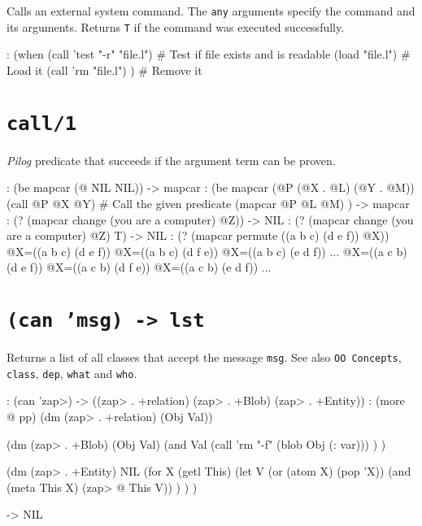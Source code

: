 Calls an external system command. The \texttt{any} arguments specify the
command and its arguments. Returns \texttt{T} if the command was executed
successfully.


\begin{wideverbatim}
: (when (call 'test "-r" "file.l")  # Test if file exists and is readable
   (load "file.l")  # Load it
   (call 'rm "file.l") )  # Remove it
\end{wideverbatim}

 
\section*{\texttt{call/1}}
\label{sec:funct-rec-C-call/1}


\emph{Pilog} predicate that succeeds if the argument term
can be proven.


\begin{wideverbatim}
: (be mapcar (@ NIL NIL))
-> mapcar
: (be mapcar (@P (@X . @L) (@Y . @M))
   (call @P @X @Y)                        # Call the given predicate
   (mapcar @P @L @M) )
-> mapcar
:  (? (mapcar change (you are a computer) @Z))
-> NIL
:  (? (mapcar change (you are a computer) @Z) T)
-> NIL
:  (? (mapcar permute ((a b c) (d e f)) @X))
 @X=((a b c) (d e f))
 @X=((a b c) (d f e))
 @X=((a b c) (e d f))
 ...
 @X=((a c b) (d e f))
 @X=((a c b) (d f e))
 @X=((a c b) (e d f))
 ...
\end{wideverbatim}

 
\section*{\texttt{(can 'msg) -> lst}}
\label{sec:funct-rec-C-(can-'msg)-->-lst}


Returns a list of all classes that accept the message \texttt{msg}. See also
\texttt{OO Concepts}, \texttt{class}, \texttt{dep}, \texttt{what} and \texttt{who}.


\begin{wideverbatim}
: (can 'zap>)
-> ((zap> . +relation) (zap> . +Blob) (zap> . +Entity))
: (more @ pp)
(dm (zap> . +relation) (Obj Val))

(dm (zap> . +Blob) (Obj Val)
   (and
      Val
      (call 'rm "-f" (blob Obj (: var))) ) )

(dm (zap> . +Entity) NIL
   (for X (getl This)
      (let V (or (atom X) (pop 'X))
         (and (meta This X) (zap> @ This V)) ) ) )

-> NIL
\end{wideverbatim}

